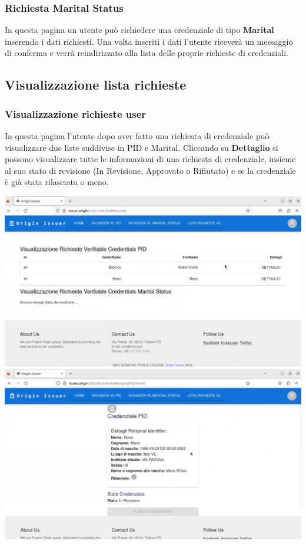 \subsubsection{Richiesta Marital Status}
In questa pagina un utente può richiedere una credenziale di tipo \textbf{Marital} inserendo i dati richiesti. Una volta inseriti i dati l'utente riceverà un messaggio di conferma e verrà reindirizzato alla lista delle proprie richieste di credenziali.

\subsection{Visualizzazione lista richieste}
\subsubsection{Visualizzazione richieste user} 
In questa pagina l'utente dopo aver fatto una richiesta di credenziale può visualizzare due liste suddivise in PID e Marital. Cliccando su \textbf{Dettaglio} si possono visualizzare tutte le informazioni di una richiesta di credenziale, insieme al suo stato di revisione (In Revisione, Approvato o Rifiutato) e se la credenziale è già stata rilasciata o meno.
\begin{center}
    \includegraphics[scale = 0.2]{./res/img/issuer/new/listauser1.png}
    \includegraphics[scale = 0.2]{./res/img/issuer/new/listauser2.png}

\end{center}

